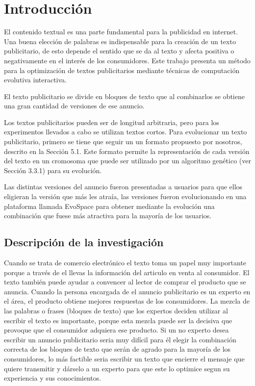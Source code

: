 
\chapter{Introducción}

El contenido textual es una parte fundamental para la publicidad en internet. Una buena elección de palabras es indispensable para la creación de un texto publicitario, de esto depende el sentido que se da al texto y afecta positiva o negativamente en el interés de los consumidores. Este trabajo presenta un método para la optimización de textos publicitarios mediante técnicas de computación evolutiva interactiva. 

El texto publicitario se divide en bloques de texto que al combinarlos se obtiene una gran cantidad de versiones de ese anuncio.

Los textos publicitarios pueden ser de longitud arbitraria, pero para los experimentos llevados a cabo se utilizan textos cortos. Para evolucionar un texto publicitario, primero se tiene que seguir un un formato propuesto por nosotros, descrito en la Sección 5.1. Este formato permite la representación de cada versión del texto en un cromosoma que puede ser utilizado por un algoritmo genético (ver Sección 3.3.1) para su evolución. 

Las distintas versiones del anuncio fueron presentadas a usuarios para que ellos eligieran la versión que más les atraía, las versiones fueron evolucionando en una plataforma llamada EvoSpace para obtener mediante la evolución una combinación que fuese más atractiva para la mayoría de los usuarios. 

\clearpage
\section{Descripción de la investigación}

Cuando se trata de comercio electrónico el texto toma un papel muy importante porque a través de el llevas la información del articulo en venta al consumidor. \cite{choi2002antecedents} El texto también puede ayudar a convencer al lector de comprar el producto que se anuncia. Cuando la persona encargada de el anuncio publicitario es un experto en el área, el producto obtiene mejores respuestas de los consumidores. La mezcla de las palabras o frases (bloques de texto) que los expertos deciden utilizar al escribir el texto es importante, porque esta mezcla puede ser la decisiva que provoque que el consumidor adquiera ese producto. Si un no experto desea escribir un anuncio publicitario seria muy difícil para él elegir la combinación correcta de los bloques de texto que serán de agrado para la mayoría de los consumidores, lo más factible seria escribir un texto que encierre el mensaje que quiere transmitir y dárselo a un experto para que este lo optimice segun su experiencia y sus conocimientos. 


